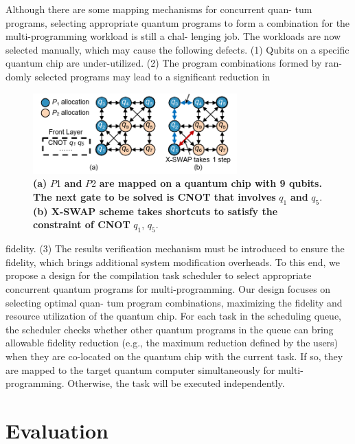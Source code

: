 \documentclass{article}
\begin{document}
	Although there are some mapping mechanisms for concurrent quan-
	tum programs, selecting appropriate quantum programs to form
	a combination for the multi-programming workload is still a chal-
	lenging job. The workloads are now selected manually, which may
	cause the following defects. (1) Qubits on a specific quantum chip
	are under-utilized. (2) The program combinations formed by ran-
	domly selected programs may lead to a significant reduction in 
	\begin{figure}[H]
		\centering
		\includegraphics[width=0.7\textwidth]{figure_2.png}
		\caption{\textbf{(a)} $P$1 \textbf{and} $P$2 \textbf{are mapped on a quantum chip with
				9 qubits. The next gate to be solved is CNOT that involves}
			$q_1$ \textbf{and} $q_5$. \textbf{(b) X-SWAP scheme takes shortcuts to satisfy the
				constraint of CNOT} $q_1$, $q_5$.}
		\label{fig:image2}
	\end{figure}
	
	
	
	fidelity. (3) The results verification mechanism must be introduced
	to ensure the fidelity, which brings additional system modification
	overheads. To this end, we propose a design for the compilation task
	scheduler to select appropriate concurrent quantum programs for
	multi-programming. Our design focuses on selecting optimal quan-
	tum program combinations, maximizing the fidelity and resource
	utilization of the quantum chip. For each task in the scheduling
	queue, the scheduler checks whether other quantum programs in
	the queue can bring allowable fidelity reduction (e.g., the maximum
	reduction defined by the users) when they are co-located on the
	quantum chip with the current task. If so, they are mapped to the
	target quantum computer simultaneously for multi-programming.
	Otherwise, the task will be executed independently.
	
	
	\section{Evaluation}
	
\end{document}
